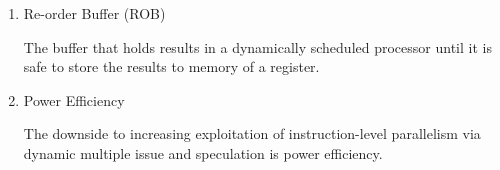 \documentclass[12pt]{article}
\newenvironment{QandA}{\begin{enumerate}[label=\bfseries\arabic*.]\bfseries}
                      {\end{enumerate}}
\newenvironment{answered}{\par\quad\normalfont}{}
\begin{document}
\begin{QandA}
\item Re-order Buffer (ROB)
\begin{answered}
The buffer that holds results in a dynamically scheduled processor until it is safe to store the results to memory of a register. 
\end{answered}

\item Power Efficiency
\begin{answered}
The downside to increasing exploitation of instruction-level parallelism via dynamic multiple issue and speculation is power efficiency. 
\end{answered}
\end{QandA}
\end{document}
